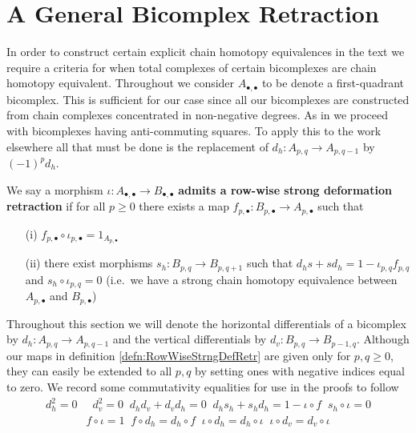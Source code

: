 \section{A General Bicomplex Retraction}\label{sec:bicomplexes}

In order to construct certain explicit chain homotopy equivalences in the text we require a criteria for when total complexes of certain bicomplexes are chain homotopy equivalent. Throughout we consider $A_{\bullet,\bullet}$ to be denote a first-quadrant bicomplex. This is sufficient for our case since all our bicomplexes are constructed from chain complexes concentrated in non-negative degrees. As in \cite{BJORT} we proceed with bicomplexes having anti-commuting squares. To apply this to the work elsewhere all that must be done is the replacement of $d_h:A_{p,q}\to A_{p,q-1}$ by $(-1)^pd_h$.

\begin{defn}[label=defn:RowWiseStrngDefRetr]
    We say a morphism $\iota:A_{\bullet,\bullet}\to B_{\bullet,\bullet}$ \textbf{admits a row-wise strong deformation retraction} if for all $p \geq 0$ there exists a map $f_{p,\bullet}:B_{p,\bullet}\to A_{p,\bullet}$ such that
    \begin{itemize}
        \item[(i)] $f_{p,\bullet}\circ \iota_{p,\bullet} = 1_{A_{p,\bullet}}$
        \item[(ii)] there exist morphisms $s_h:B_{p,q}\to B_{p,q+1}$ such that $d_hs+sd_h = 1-\iota_{p,q}f_{p,q}$ and $s_h\circ \iota_{p,q} = 0$ (i.e.\ we have a strong chain homotopy equivalence between $A_{p,\bullet}$ and $B_{p,\bullet}$)
    \end{itemize}
\end{defn}

Throughout this section we will denote the horizontal differentials of a bicomplex by $d_h:A_{p,q}\to A_{p,q-1}$ and the vertical differentials by $d_v:B_{p,q}\to B_{p-1,q}$. Although our maps in definition \ref{defn:RowWiseStrngDefRetr} are given only for $p,q\geq 0$, they can easily be extended to all $p,q$ by setting ones with negative indices equal to zero. We record some commutativity equalities for use in the proofs to follow
\begin{align*}
    d_h^2 = 0 &\;\; d_v^2=0 \;\; d_hd_v+d_vd_h = 0\;\; d_hs_h+s_hd_h=1-\iota \circ f\;\; s_h\circ \iota = 0 \\
    & f\circ \iota = 1\;\; f \circ d_h= d_h\circ f\;\; \iota \circ d_h= d_h\circ \iota \;\; \iota \circ d_v = d_v\circ \iota 
\end{align*}

